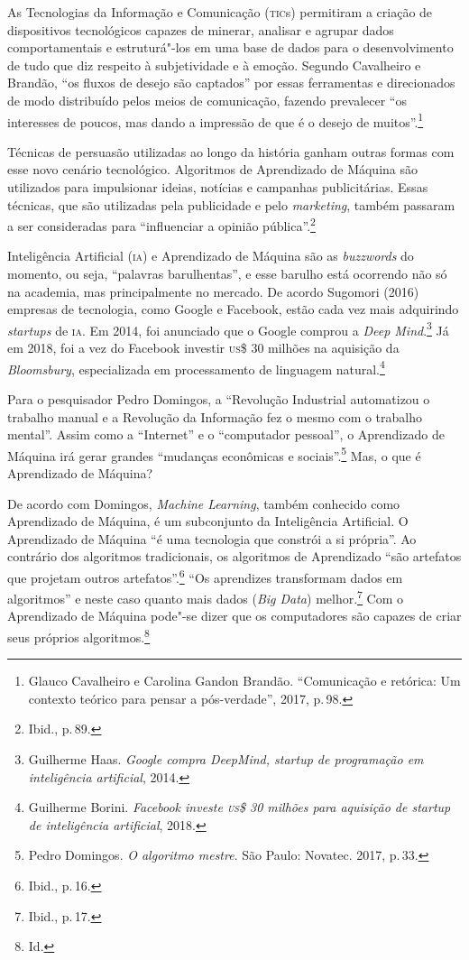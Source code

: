 \noindent{}As Tecnologias da Informação e Comunicação (\textsc{tic}s) permitiram a criação
de dispositivos tecnológicos capazes de minerar, analisar e agrupar
dados comportamentais e estruturá"-los em uma base de dados para o
desenvolvimento de tudo que diz respeito à subjetividade e à emoção.
Segundo Cavalheiro e Brandão, ``os fluxos de desejo são captados''
por essas ferramentas e direcionados de modo distribuído pelos meios de
comunicação, fazendo prevalecer ``os interesses de poucos, mas dando a
impressão de que é o desejo de muitos''.\footnote{Glauco Cavalheiro e Carolina Gandon Brandão. ``Comunicação e
retórica: Um contexto teórico para pensar a pós-verdade'', 2017, p.\,98.}

Técnicas de persuasão utilizadas ao longo da história ganham outras
formas com esse novo cenário tecnológico. Algoritmos de Aprendizado de
Máquina são utilizados para impulsionar ideias, notícias e campanhas
publicitárias. Essas técnicas, que são utilizadas pela publicidade e
pelo \emph{marketing}, também passaram a ser consideradas para ``influenciar a
opinião pública''.\footnote{Ibid., p.\,89.}

Inteligência Artificial (\textsc{ia}) e Aprendizado de Máquina são as
\emph{buzzwords} do momento, ou seja, ``palavras barulhentas'', e esse
barulho está ocorrendo não só na academia, mas principalmente no
mercado. De acordo Sugomori (2016) empresas de tecnologia, como Google e
Facebook, estão cada vez mais adquirindo \emph{startups} de \textsc{ia}. Em 2014,
foi anunciado que o Google comprou a \emph{Deep Mind}.\footnote{Guilherme Haas. \emph{Google compra DeepMind, startup de programação
em inteligência artificial}, 2014.} Já
em 2018, foi a vez do Facebook investir \textsc{us}\$ 30 milhões na aquisição da
\emph{Bloomsbury}, especializada em processamento de linguagem natural.\footnote{Guilherme Borini. \emph{Facebook investe \textsc{us}\$ 30 milhões para
aquisição de startup de inteligência artificial}, 2018.}

Para o pesquisador Pedro Domingos, a ``Revolução Industrial
automatizou o trabalho manual e a Revolução da Informação fez o mesmo
com o trabalho mental''. Assim como a ``Internet'' e o ``computador
pessoal'', o Aprendizado de Máquina irá gerar grandes ``mudanças
econômicas e sociais''.\footnote{Pedro Domingos. \emph{O algoritmo mestre}. São Paulo: Novatec. 2017, p.\,33.} Mas, o que é Aprendizado de Máquina?

De acordo com Domingos, \emph{Machine Learning}, também conhecido
como Aprendizado de Máquina, é um subconjunto da Inteligência
Artificial. O Aprendizado de Máquina ``é uma tecnologia que constrói a
si própria''. Ao contrário dos algoritmos tradicionais, os algoritmos de
Aprendizado ``são artefatos que projetam outros artefatos''.\footnote{Ibid., p.\,16.}
``Os aprendizes transformam dados em algoritmos'' e neste caso quanto
mais dados (\emph{Big Data}) melhor.\footnote{Ibid., p.\,17.} Com o Aprendizado de
Máquina pode"-se dizer que os computadores são capazes de criar seus
próprios algoritmos.\footnote{Id.}

